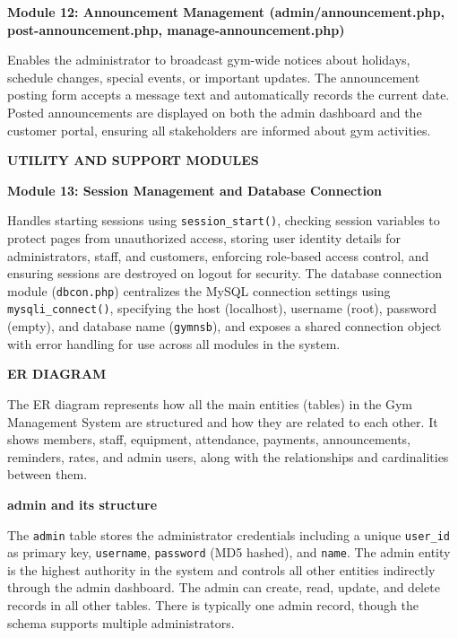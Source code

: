 \documentclass[12pt,a4paper]{report}
\begin{document}
\textbf{Module 12: Announcement Management (admin/announcement.php, post-announcement.php, manage-announcement.php)}

Enables the administrator to broadcast gym-wide notices about holidays, schedule changes, special events, or important updates. The announcement posting form accepts a message text and automatically records the current date. Posted announcements are displayed on both the admin dashboard and the customer portal, ensuring all stakeholders are informed about gym activities.

\textbf{UTILITY AND SUPPORT MODULES}

\textbf{Module 13: Session Management and Database Connection}

Handles starting sessions using \texttt{session\_start()}, checking session variables to protect pages from unauthorized access, storing user identity details for administrators, staff, and customers, enforcing role-based access control, and ensuring sessions are destroyed on logout for security. The database connection module (\texttt{dbcon.php}) centralizes the MySQL connection settings using \texttt{mysqli\_connect()}, specifying the host (localhost), username (root), password (empty), and database name (\texttt{gymnsb}), and exposes a shared connection object with error handling for use across all modules in the system.

\newpage
\vspace*{\fill}
\begin{center}
{\LARGE \textbf{ER DIAGRAM}}
\end{center}
\vspace*{\fill}

\newpage
The ER diagram represents how all the main entities (tables) in the Gym Management System are structured and how they are related to each other. It shows members, staff, equipment, attendance, payments, announcements, reminders, rates, and admin users, along with the relationships and cardinalities between them.

\textbf{admin and its structure}

The \texttt{admin} table stores the administrator credentials including a unique \texttt{user\_id} as primary key, \texttt{username}, \texttt{password} (MD5 hashed), and \texttt{name}. The admin entity is the highest authority in the system and controls all other entities indirectly through the admin dashboard. The admin can create, read, update, and delete records in all other tables. There is typically one admin record, though the schema supports multiple administrators.
\end{document}
